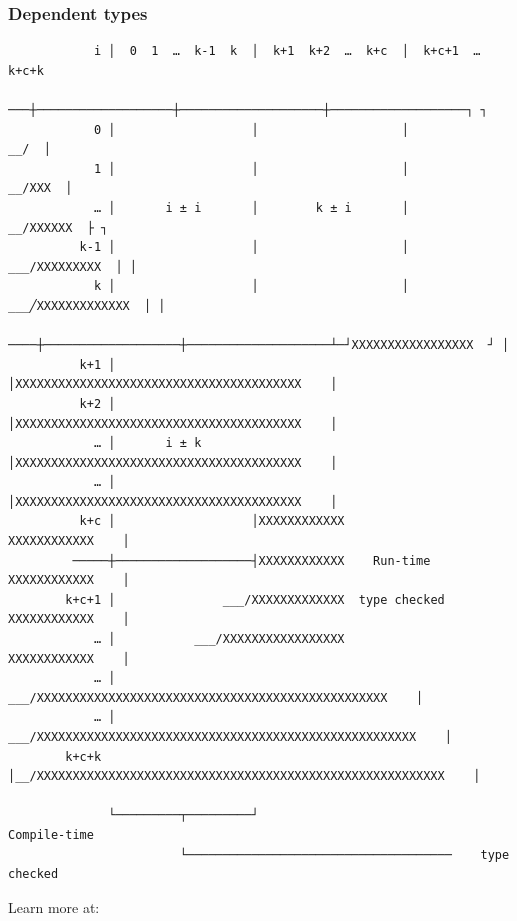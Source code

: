 \documentclass{beamer}
\begin{document}
    \begin{frame}[fragile]
        \frametitle{Dependent types}
        \begin{tiny}
        \begin{verbatim}
            i │  0  1  …  k-1  k  │  k+1  k+2  …  k+c  │  k+c+1  …  k+c+k
           ───┼───────────────────┼────────────────────┼───────────────────┐ ┐
            0 │                   │                    │                __/  │
            1 │                   │                    │             __/XXX  │
            … │       i ± i       │        k ± i       │          __/XXXXXX  ├ ┐
          k-1 │                   │                    │      ___/XXXXXXXXX  │ │
            k │                   │                    │  ___╱XXXXXXXXXXXXX  │ │
          ────┼───────────────────┼────────────────────┴─┘XXXXXXXXXXXXXXXXX  ┘ │
          k+1 │                   │XXXXXXXXXXXXXXXXXXXXXXXXXXXXXXXXXXXXXXXX    │
          k+2 │                   │XXXXXXXXXXXXXXXXXXXXXXXXXXXXXXXXXXXXXXXX    │
            … │       i ± k       │XXXXXXXXXXXXXXXXXXXXXXXXXXXXXXXXXXXXXXXX    │
            … │                   │XXXXXXXXXXXXXXXXXXXXXXXXXXXXXXXXXXXXXXXX    │
          k+c │                   │XXXXXXXXXXXX                XXXXXXXXXXXX    │
         ─────┼───────────────────┤XXXXXXXXXXXX    Run-time    XXXXXXXXXXXX    │
        k+c+1 │               ___/XXXXXXXXXXXXX  type checked  XXXXXXXXXXXX    │
            … │           ___/XXXXXXXXXXXXXXXXX                XXXXXXXXXXXX    │
            … │       ___/XXXXXXXXXXXXXXXXXXXXXXXXXXXXXXXXXXXXXXXXXXXXXXXXX    │
            … │   ___/XXXXXXXXXXXXXXXXXXXXXXXXXXXXXXXXXXXXXXXXXXXXXXXXXXXXX    │
        k+c+k │__/XXXXXXXXXXXXXXXXXXXXXXXXXXXXXXXXXXXXXXXXXXXXXXXXXXXXXXXXX    │

              └─────────┬─────────┘                               Compile-time
                        └─────────────────────────────────────    type checked
        \end{verbatim}
        \end{tiny}
    \end{frame}

    \begin{frame}
        \begin{center}
            \Huge{Learn more at: \\~\\
            \href{http://array22.ndan.co}{\color{blue}{http://array22.ndan.co}}}
        \end{center}
    \end{frame}
\end{document}
